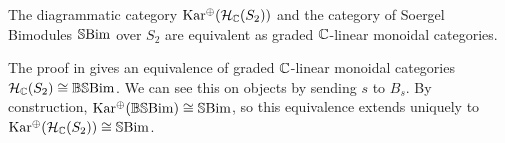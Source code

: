 \begin{theorem} \label{thm:one-col-sbim-equiv}
    The diagrammatic category $\operatorname{Kar^\oplus}(\mathcal{H}_{\mathbb{C}}(S_2))$ and the category of Soergel Bimodules $\operatorname{\mathbb{S}Bim}$ over $S_2$ are equivalent as graded $\mathbb{C}$-linear monoidal categories.
\end{theorem}
The proof in \cite{elias-williamson-soergel-calculus} gives an equivalence of graded $\mathbb{C}$-linear monoidal categories $\mathcal{H}_{\mathbb{C}}(S_2) \cong \operatorname{\mathbb{BS}Bim}$. We can see this on objects by sending $s$ to $B_s$. By construction, $\operatorname{Kar^\oplus}(\operatorname{\mathbb{BS}Bim}) \cong \operatorname{\mathbb{S}Bim}$, so this equivalence extends uniquely to $\operatorname{Kar^\oplus}(\mathcal{H}_{\mathbb{C}}(S_2)) \cong \operatorname{\mathbb{S}Bim}$.

